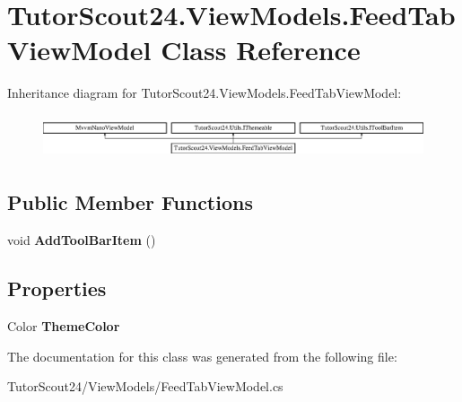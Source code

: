 \hypertarget{class_tutor_scout24_1_1_view_models_1_1_feed_tab_view_model}{}\section{Tutor\+Scout24.\+View\+Models.\+Feed\+Tab\+View\+Model Class Reference}
\label{class_tutor_scout24_1_1_view_models_1_1_feed_tab_view_model}
Inheritance diagram for Tutor\+Scout24.\+View\+Models.\+Feed\+Tab\+View\+Model\+:\begin{figure}[H]
\begin{center}
\leavevmode
\includegraphics[height=1.309942cm]{class_tutor_scout24_1_1_view_models_1_1_feed_tab_view_model}
\end{center}
\end{figure}
\subsection*{Public Member Functions}
\begin{DoxyCompactItemize}
\item 
\mbox{\label{class_tutor_scout24_1_1_view_models_1_1_feed_tab_view_model_ab2245beafe288ad7ca40e086a9cd3cef}} 
void {\bfseries Add\+Tool\+Bar\+Item} ()
\end{DoxyCompactItemize}
\subsection*{Properties}
\begin{DoxyCompactItemize}
\item 
\mbox{\label{class_tutor_scout24_1_1_view_models_1_1_feed_tab_view_model_a1fb664a0bf5ac65c73a1d86b6c714459}} 
Color {\bfseries Theme\+Color}
\end{DoxyCompactItemize}


The documentation for this class was generated from the following file\+:\begin{DoxyCompactItemize}
\item 
Tutor\+Scout24/\+View\+Models/Feed\+Tab\+View\+Model.\+cs\end{DoxyCompactItemize}
